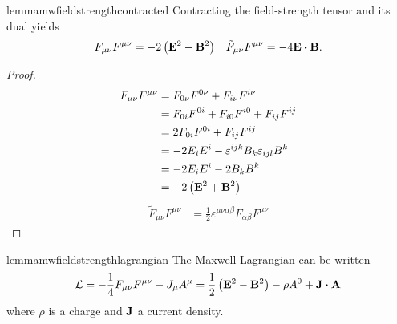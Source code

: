 \begin{restatable}{lemma}{mwfieldstrengthcontracted}\label{thm:mw_field_strength_contracted}
	Contracting the field-strength tensor and its dual yields
		\begin{align}
		F_{\mu\nu}
		F^{\mu\nu}
		=
		-2
		\left(
			\vb{E}^2
			-
			\vb{B}^2
		\right)
		&&
		\tilde{F}_{\mu\nu}
		F^{\mu\nu}
		=
		-
		4
		\vb{E}
		\vdot
		\vb{B}
		.
	\end{align}
\end{restatable}
\begin{proof}
	\begin{equation*}
		\begin{split}
			F_{\mu\nu}
			F^{\mu\nu}
			&=
			F_{0\nu}
			F^{0\nu}
			+
			F_{i\nu}
			F^{i\nu}
			\\
			&=
			F_{0i}
			F^{0i}
			+
			F_{i0}
			F^{i0}
			+
			F_{ij}
			F^{ij}
			\\
			&=
			2
			F_{0i}
			F^{0i}
			+
			F_{ij}
			F^{ij}
			\\
			&=
			-2
			E_i
			E^i
			-
			\varepsilon^{ijk}B_k
			\varepsilon_{ijl}B^k
			\\
			&=
			-
			2
			E_i
			E^i
			-
			2
			B_k
			B^k
			\\
			&=
			-
			2
			\left(
				\vb{E}^2
				+
				\vb{B}^2
			\right)
		\end{split}
	\end{equation*}
	\begin{equation*}
		\begin{split}
			\tilde{F}_{\mu\nu}
			F^{\mu\nu}
			&=
			\frac{1}{2}
			\varepsilon^{\mu\nu\alpha\beta}
			F_{\alpha\beta}
			F^{\mu\nu}
		\end{split}
	\end{equation*}
\end{proof}
\begin{restatable}{lemma}{mwfieldstrengthlagrangian}\label{thm:mw_field_strength_lagrangian}
	The Maxwell Lagrangian can be written
	\begin{equation}
		\mathcal{L}
		=
		-
		\frac{1}{4}
		F_{\mu\nu}
		F^{\mu\nu}
		-
		J_\mu A^\mu
		=
		\frac{1}{2}
		\left(
			\vb{E}^2
			-
			\vb{B}^2
		\right)
		-
		\rho A^0
		+
		\vb{J}\vdot\vb{A}
	\end{equation}
	where $\rho$ is a charge and $\vb{J}$ a current density.
\end{restatable}

